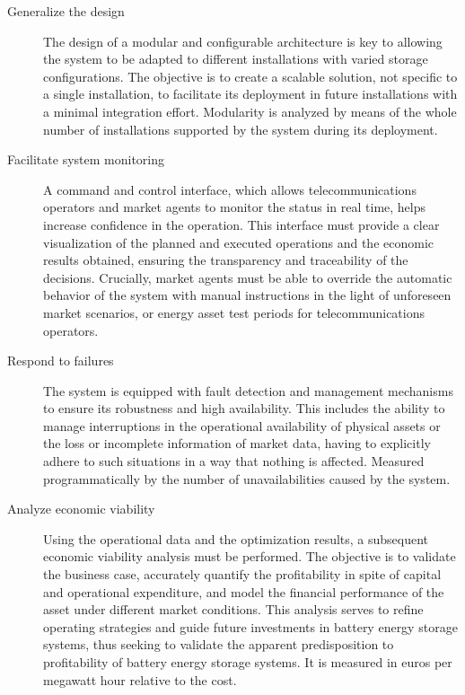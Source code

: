\begin{description}
  \item[Generalize the design] The design of a modular and configurable architecture is key to allowing the system to be adapted to different installations with varied storage configurations. The objective is to create a scalable solution, not specific to a single installation, to facilitate its deployment in future installations with a minimal integration effort. Modularity is analyzed by means of the whole number of installations supported by the system during its deployment.

  \item[Facilitate system monitoring] A command and control interface, which allows telecommunications operators and market agents to monitor the status in real time, helps increase confidence in the operation. This interface must provide a clear visualization of the planned and executed operations and the economic results obtained, ensuring the transparency and traceability of the decisions. Crucially, market agents must be able to override the automatic behavior of the system with manual instructions in the light of unforeseen market scenarios, or energy asset test periods for telecommunications operators.

  \item[Respond to failures] The system is equipped with fault detection and management mechanisms to ensure its robustness and high availability. This includes the ability to manage interruptions in the operational availability of physical assets or the loss or incomplete information of market data, having to explicitly adhere to such situations in a way that nothing is affected. Measured programmatically by the number of unavailabilities caused by the system.

  \item[Analyze economic viability] Using the operational data and the optimization results, a subsequent economic viability analysis must be performed. The objective is to validate the business case, accurately quantify the profitability in spite of capital and operational expenditure, and model the financial performance of the asset under different market conditions. This analysis serves to refine operating strategies and guide future investments in battery energy storage systems, thus seeking to validate the apparent predisposition to profitability of battery energy storage systems. It is measured in euros per megawatt hour relative to the cost.

\end{description}

